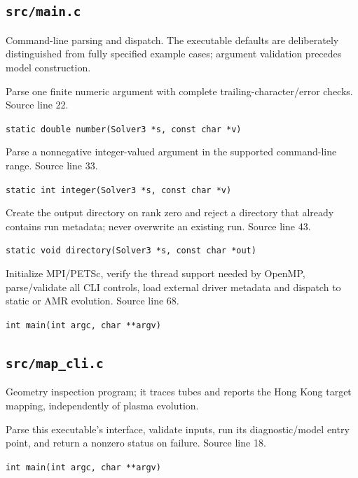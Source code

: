 \subsection{\texttt{src/main.c}}
Command-line parsing and dispatch. The executable defaults are deliberately distinguished from fully specified example cases; argument validation precedes model construction.
\begin{description}[style=nextline,leftmargin=0pt,labelindent=0pt,labelwidth=0pt,labelsep=0pt]
\item[\texttt{number}] Parse one finite numeric argument with complete trailing-character/error checks. Source line 22.\par
{\small\nolinkurl{static double number(Solver3 *s, const char *v)}}
\item[\texttt{integer}] Parse a nonnegative integer-valued argument in the supported command-line range. Source line 33.\par
{\small\nolinkurl{static int integer(Solver3 *s, const char *v)}}
\item[\texttt{directory}] Create the output directory on rank zero and reject a directory that already contains run metadata; never overwrite an existing run. Source line 43.\par
{\small\nolinkurl{static void directory(Solver3 *s, const char *out)}}
\item[\texttt{main}] Initialize MPI/PETSc, verify the thread support needed by OpenMP, parse/validate all CLI controls, load external driver metadata and dispatch to static or AMR evolution. Source line 68.\par
{\small\nolinkurl{int main(int argc, char **argv)}}
\end{description}
\subsection{\texttt{src/map\_cli.c}}
Geometry inspection program; it traces tubes and reports the Hong Kong target mapping, independently of plasma evolution.
\begin{description}[style=nextline,leftmargin=0pt,labelindent=0pt,labelwidth=0pt,labelsep=0pt]
\item[\texttt{main}] Parse this executable's interface, validate inputs, run its diagnostic/model entry point, and return a nonzero status on failure. Source line 18.\par
{\small\nolinkurl{int main(int argc, char **argv)}}
\end{description}
